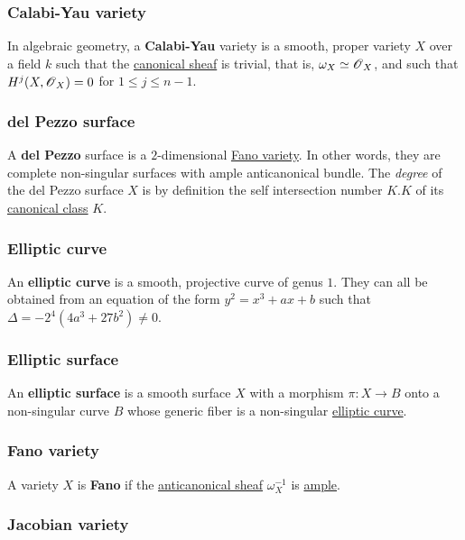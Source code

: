 \documentclass[11pt, english]{article}
\begin{document}
\subsubsection{Calabi-Yau variety}

In algebraic geometry, a \textbf{Calabi-Yau} variety is a smooth, proper variety $X$ over a field $k$ such that the \hyperref[canonicaldivisor]{canonical sheaf} is trivial, that is, $\omega_X \simeq \operatorname{\mathscr{O}}_X$, and such that $H^j(X,\operatorname{\mathscr{O}}_X)=0$ for $1 \leq j \leq n-1$. 

\subsubsection{del Pezzo surface}
\label{delpezzo}

A \textbf{del Pezzo} surface is a $2$-dimensional \hyperref[fano]{Fano variety}. In other words, they are complete non-singular surfaces with ample anticanonical bundle. The \emph{degree} of the del Pezzo surface $X$ is by definition the self intersection number $K.K$ of its \hyperref[canonicaldivisor]{canonical class} $K$. 

\subsubsection{Elliptic curve}
\label{ellipticc}

An \textbf{elliptic curve} is a smooth, projective curve of genus $1$. They can all be obtained from an equation of the form $y^2=x^3+ax+b$ such that $\Delta = -2^4(4a^3+27b^2) \neq 0$. 

\subsubsection{Elliptic surface}
\label{elliptics}

An \textbf{elliptic surface} is a smooth surface $X$ with a morphism $\pi:X \to B$ onto a non-singular curve $B$ whose generic fiber is a non-singular \hyperref[ellipticc]{elliptic curve}.

\subsubsection{Fano variety}
\label{fano}

A variety $X$ is \textbf{Fano} if the \hyperref[anticanonical]{anticanonical  sheaf} $\omega_X^{-1}$ is \hyperref[amplelinebundle]{ample}.  

\subsubsection{Jacobian variety}
\label{jacobianvariety}
\end{document}
